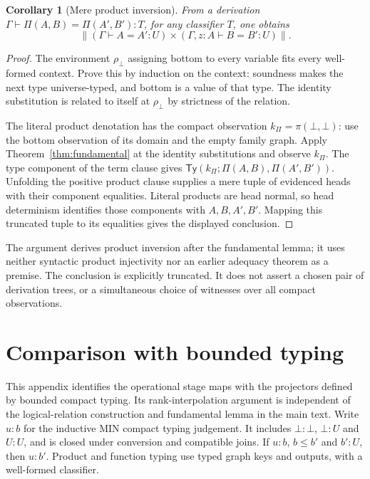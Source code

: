 \documentclass[11pt,a4paper]{article}
\newtheorem{corollary}[theorem]{Corollary}
\theoremstyle{definition}
\theoremstyle{remark}
\newcommand{\TyRel}{\mathsf{Ty}}
\newcommand{\trunc}[1]{\left\lVert #1\right\rVert}
\begin{document}
\begin{corollary}[Mere product inversion]\label{cor:independent-pi}
From a derivation $\Gamma\vdash\Pi(A,B)=\Pi(A',B'):T$, for any
classifier $T$, one obtains
\[
 \trunc{(\Gamma\vdash A=A':U)\mathbin{\times}
          (\Gamma,z:A\vdash B=B':U)}.
\]
\end{corollary}
\begin{proof}
The environment $\rho_\bot$ assigning bottom to every variable fits
every well-formed context. Prove this by induction on the context:
soundness makes the next type universe-typed, and bottom is a value of
that type. The identity substitution is related to itself at $\rho_\bot$
by strictness of the relation.

The literal product denotation has the compact observation
$k_\Pi=\pi(\bot,\bot)$: use the bottom observation of its domain and the
empty family graph. Apply Theorem~\ref{thm:fundamental} at the identity
substitutions and observe $k_\Pi$. The type component of the term clause
gives $\TyRel(k_\Pi;\Pi(A,B),\Pi(A',B'))$. Unfolding the positive
product clause supplies a mere tuple of evidenced heads with their
component equalities. Literal products are head normal, so head
determinism identifies those components with $A,B,A',B'$. Mapping this
truncated tuple to its equalities gives the displayed conclusion.
\end{proof}

The argument derives product inversion after the fundamental lemma; it
uses neither syntactic product injectivity nor an earlier adequacy
theorem as a premise. The conclusion is explicitly truncated. It does
not assert a chosen pair of derivation trees, or a simultaneous choice
of witnesses over all compact observations.

\clearpage
\appendix
\section{Comparison with bounded typing}\label{app:bounded-typing}

This appendix identifies the operational stage maps with the projectors
defined by bounded compact typing. Its rank-interpolation argument is
independent of the logical-relation construction and fundamental lemma
in the main text. Write $u:b$ for the
inductive MIN compact typing judgement. It includes $\bot:\bot$,
$\bot:U$ and $U:U$, and is closed under conversion and compatible joins.
If $u:b$, $b\leq b'$ and $b':U$, then $u:b'$. Product and function
typing use typed graph keys and outputs, with a well-formed classifier.
\end{document}
